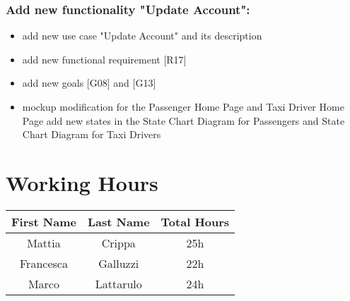\subsubsection{Add new functionality "Update Account":}
\begin{itemize}
	\item add new use case "Update Account" and its description
	\item add new functional requirement [R17]
	\item add new goals [G08] and [G13]
	\item mockup modification for the Passenger Home Page and Taxi Driver Home Page
add new states in the State Chart Diagram for Passengers and State Chart Diagram for Taxi Drivers
\end{itemize}

\section{Working Hours}

\begin{table}[htbp]
\begin{center}
\begin{tabular}[t]{ccc}

\hline
\textbf{First Name} & \textbf{Last Name} & \textbf{Total Hours} \\
\hline
Mattia & Crippa &  25h\\
\hline
Francesca & Galluzzi &  22h\\
\hline
Marco & Lattarulo & 24h\\
\hline

\end{tabular}
\end{center}
\end{table}